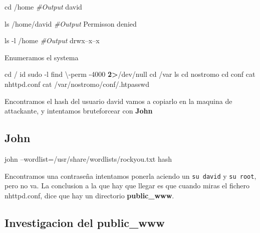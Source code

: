 \documentclass{assets/ipesethesis}
\newenvironment{Shaded}{\begin{snugshade}}{\end{snugshade}}
\newcommand{\BuiltInTok}[1]{#1}
\newcommand{\CommentTok}[1]{\textcolor[rgb]{0.56,0.35,0.01}{\textit{#1}}}
\newcommand{\ExtensionTok}[1]{#1}
\newcommand{\FunctionTok}[1]{\textcolor[rgb]{0.00,0.00,0.00}{#1}}
\newcommand{\NormalTok}[1]{#1}
\newcommand{\OperatorTok}[1]{\textcolor[rgb]{0.81,0.36,0.00}{\textbf{#1}}}
\begin{document}
\begin{Shaded}
\begin{Highlighting}[]
\BuiltInTok{cd}\NormalTok{ /home}
\CommentTok{#Output}
\ExtensionTok{david}

\FunctionTok{ls}\NormalTok{ /home/david}
\CommentTok{#Output}
\ExtensionTok{Permisson}\NormalTok{ denied}

\FunctionTok{ls}\NormalTok{ -l /home}
\CommentTok{#Output}
\ExtensionTok{drwx--x--x}
\end{Highlighting}
\end{Shaded}

Enumeramos el systema

\begin{Shaded}
\begin{Highlighting}[]
\BuiltInTok{cd}\NormalTok{ /}
\FunctionTok{id}
\FunctionTok{sudo}\NormalTok{ -l}
\FunctionTok{find}\NormalTok{ \textbackslash{}-perm -4000 }\OperatorTok{2>}\NormalTok{/dev/null}
\BuiltInTok{cd}\NormalTok{ /var}
\FunctionTok{ls}
\BuiltInTok{cd}\NormalTok{ nostromo}
\BuiltInTok{cd}\NormalTok{ conf}
\FunctionTok{cat}\NormalTok{ nhttpd.conf}
\FunctionTok{cat}\NormalTok{ /var/nostromo/conf/.htpasswd}
\end{Highlighting}
\end{Shaded}

Encontramos el hash del usuario david vamos a copiarlo en la maquina de attackante, y intentamos bruteforcear con \textbf{John}

\hypertarget{john}{%
\subsection*{John}\label{john}}

\begin{Shaded}
\begin{Highlighting}[]
\ExtensionTok{john}\NormalTok{ --wordlist=/usr/share/wordlists/rockyou.txt hash}
\end{Highlighting}
\end{Shaded}

Encontramos una contraseña intentamos ponerla aciendo un \texttt{su\ david} y \texttt{su\ root}, pero no va. La conclusion a la que hay que llegar
es que cuando miras el fichero nhttpd.conf, dice que hay un directorio \textbf{public\_www}.

\hypertarget{investigacion-del-public_www}{%
\subsection*{Investigacion del public\_www}\label{investigacion-del-public_www}}
\end{document}
